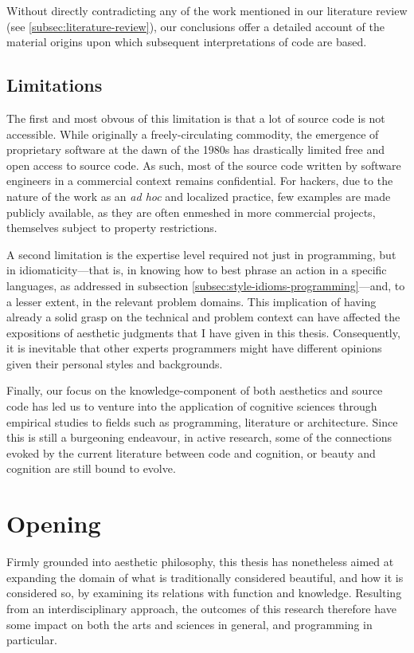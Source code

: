 Without directly contradicting any of the work mentioned in our literature review (see \ref{subsec:literature-review}), our conclusions offer a detailed account of the material origins upon which subsequent interpretations of code are based.

\subsection{Limitations}
\label{subsec:conclusion-limitations}

The first and most obvous of this limitation is that a lot of source code is not accessible. While originally a freely-circulating commodity, the emergence of proprietary software at the dawn of the 1980s \citep{hassett_impact_2012} has drastically limited free and open access to source code. As such, most of the source code written by software engineers in a commercial context remains confidential. For hackers, due to the nature of the work as an \emph{ad hoc} and localized practice, few examples are made publicly available, as they are often enmeshed in more commercial projects, themselves subject to property restrictions.


A second limitation is the expertise level required not just in programming, but in idiomaticity—that is, in knowing how to best phrase an action in a specific languages, as addressed in subsection \ref{subsec:style-idioms-programming}—and, to a lesser extent, in the relevant problem domains. This implication of having already a solid grasp on the technical and problem context can have affected the expositions of aesthetic judgments that I have given in this thesis. Consequently, it is inevitable that other experts programmers might have different opinions given their personal styles and backgrounds.

Finally, our focus on the knowledge-component of both aesthetics and source code has led us to venture into the application of cognitive sciences through empirical studies to fields such as programming, literature or architecture. Since this is still a burgeoning endeavour, in active research,  some of the connections evoked by the current literature between code and cognition, or beauty and cognition are still bound to evolve.

\section{Opening}
\label{sec:opening}

Firmly grounded into aesthetic philosophy, this thesis has nonetheless aimed at expanding the domain of what is traditionally considered beautiful, and how it is considered so, by examining its relations with function and knowledge. Resulting from an interdisciplinary approach, the outcomes of this research therefore have some impact  on both the arts and sciences in general, and programming in particular.

